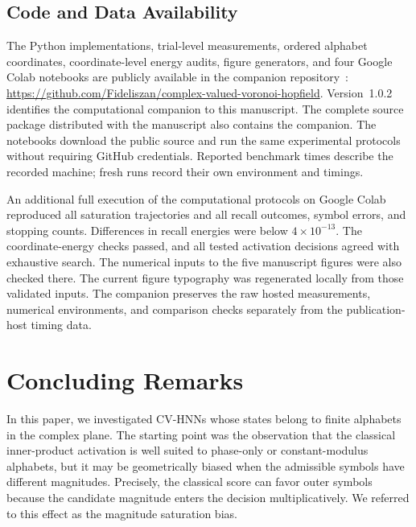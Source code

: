 \documentclass[10pt,journal,letterpaper]{IEEEtran}
\begin{document}
\subsection{Code and Data Availability}
The Python implementations, trial-level measurements, ordered alphabet
coordinates, coordinate-level energy audits, figure generators, and four
Google Colab notebooks are publicly available in the companion
repository~\cite{castro2026complexsoftware}:
\url{https://github.com/Fideliszan/complex-valued-voronoi-hopfield}.
Version~1.0.2 identifies the computational companion to this manuscript.
The complete source package distributed with the manuscript also contains
the companion. The notebooks download the public source and run the same
experimental protocols without requiring GitHub credentials.
Reported benchmark times describe the recorded machine; fresh runs record
their own environment and timings.

An additional full execution of the computational protocols on Google Colab
reproduced all saturation trajectories and all recall outcomes, symbol
errors, and stopping counts. Differences in recall energies were below
$4\times10^{-13}$. The coordinate-energy checks passed, and all tested
activation decisions agreed with exhaustive search. The numerical inputs to the five manuscript figures were also checked
there. The current figure typography was regenerated locally from those
validated inputs. The companion preserves the raw
hosted measurements, numerical environments, and comparison checks
separately from the publication-host timing data.

\section{Concluding Remarks} 
\label{sec:conclusion}

In this paper, we investigated CV-HNNs
whose states belong to finite alphabets in the complex plane. The starting
point was the observation that the classical inner-product activation is well
suited to phase-only or constant-modulus alphabets, but it may be geometrically
biased when the admissible symbols have different magnitudes. Precisely, the
classical score can favor outer symbols because the candidate magnitude enters
the decision multiplicatively. We referred to this effect as the magnitude
saturation bias.
\end{document}
